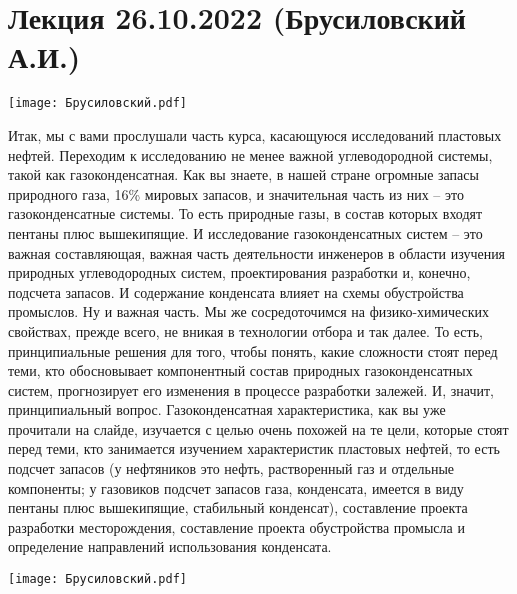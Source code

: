 \documentclass[main.tex]{subfiles}
\begin{document}
\section{Лекция 26.10.2022 (Брусиловский А.И.)}

\begin{center}
\texttt{[image: Брусиловский.pdf]}
\end{center}

Итак, мы с вами прослушали часть курса, касающуюся исследований пластовых нефтей.
Переходим к исследованию не менее важной углеводородной системы, такой как газоконденсатная.
Как вы знаете, в нашей стране огромные запасы природного газа, 16\% мировых запасов, и значительная часть из них -- это газоконденсатные системы.
То есть природные газы, в состав которых входят пентаны плюс вышекипящие.
И исследование газоконденсатных систем -- это важная составляющая, важная часть деятельности инженеров в области изучения природных углеводородных систем, проектирования разработки и, конечно, подсчета запасов.
И содержание конденсата влияет на схемы обустройства промыслов.
Ну и важная часть.
Мы же сосредоточимся на физико-химических свойствах, прежде всего, не вникая в технологии отбора и так далее.
То есть, принципиальные решения для того, чтобы понять, какие сложности стоят перед теми, кто обосновывает компонентный состав природных газоконденсатных систем, прогнозирует его изменения в процессе разработки залежей.
И, значит, принципиальный вопрос.
Газоконденсатная характеристика, как вы уже прочитали на слайде, изучается с целью очень похожей на те цели, которые стоят перед теми, кто занимается изучением характеристик пластовых нефтей, то есть подсчет запасов (у нефтяников это нефть, растворенный газ и отдельные компоненты; у газовиков подсчет запасов газа, конденсата, имеется в виду пентаны плюс вышекипящие, стабильный конденсат), составление проекта разработки месторождения, составление проекта обустройства промысла и определение направлений использования конденсата.

\begin{center}
\texttt{[image: Брусиловский.pdf]}
\end{center}
\end{document}

